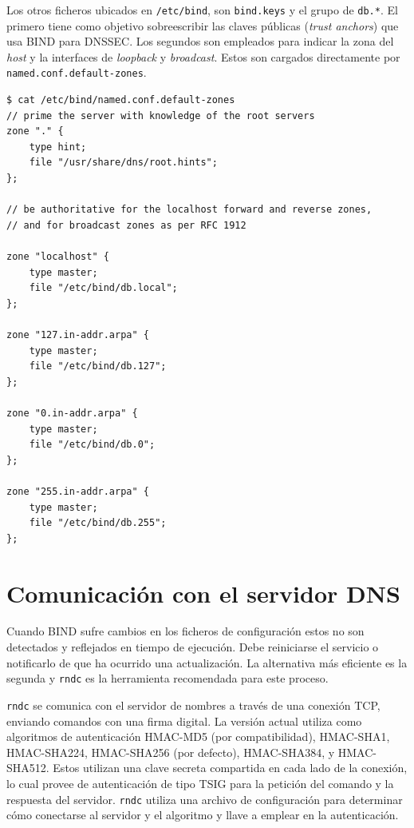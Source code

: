 Los otros ficheros ubicados en \verb+/etc/bind+, son \verb+bind.keys+ y el grupo de \verb+db.*+. El primero tiene como objetivo sobreescribir las claves públicas (\textit{trust anchors}) que usa BIND para DNSSEC. Los segundos son empleados para indicar la zona del \textit{host} y la interfaces de \textit{loopback} y \textit{broadcast}. Estos son cargados directamente por \verb+named.conf.default-zones+.

\begin{lstlisting}[frame=single, numbers=none, caption=Contenido del fichero \textbf{named.conf.default-zones}]
$ cat /etc/bind/named.conf.default-zones
// prime the server with knowledge of the root servers
zone "." {
    type hint;
    file "/usr/share/dns/root.hints";
};

// be authoritative for the localhost forward and reverse zones,
// and for broadcast zones as per RFC 1912

zone "localhost" {
    type master;
    file "/etc/bind/db.local";
};

zone "127.in-addr.arpa" {
    type master;
    file "/etc/bind/db.127";
};

zone "0.in-addr.arpa" {
    type master;
    file "/etc/bind/db.0";
};

zone "255.in-addr.arpa" {
    type master;
    file "/etc/bind/db.255";
};
\end{lstlisting}

\section{Comunicación con el servidor DNS}\label{section:comm-bind}

Cuando BIND sufre cambios en los ficheros de configuración estos no son detectados y reflejados en tiempo de ejecución. Debe reiniciarse el servicio o notificarlo de que ha ocurrido una actualización. La alternativa más eficiente es la segunda y \verb+rndc+ es la herramienta recomendada para este proceso.

\verb+rndc+ se comunica con el servidor de nombres a través de una conexión TCP, enviando comandos con una firma digital. La versión actual utiliza como algoritmos de autenticación HMAC-MD5 (por compatibilidad), HMAC-SHA1, HMAC-SHA224, HMAC-SHA256 (por defecto), HMAC-SHA384, y HMAC-SHA512. Estos utilizan una clave secreta compartida en cada lado de la conexión, lo cual provee de autenticación de tipo TSIG para la petición del comando y la respuesta del servidor. \verb+rndc+ utiliza una archivo de configuración para determinar cómo conectarse al servidor y el algoritmo y llave a emplear en la autenticación.

